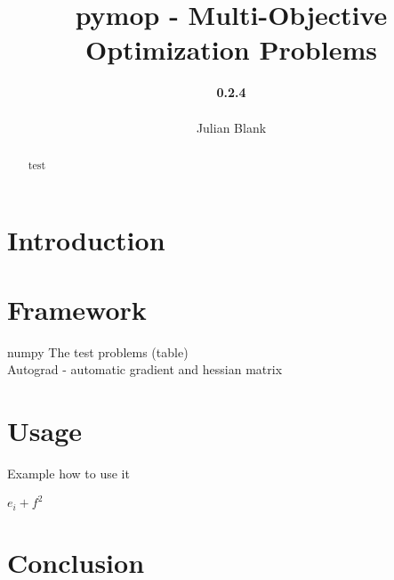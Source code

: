 \documentclass{article}
\begin{document}
	
	\title{pymop - Multi-Objective Optimization Problems}
	\author{\textbf{0.2.4} \\ \\Julian Blank}
	\date{}
	
	\maketitle
	
	\begin{abstract}
	test
	\end{abstract}
	
	\section{Introduction}

	\section{Framework}
	numpy
	The test problems (table) \\
	Autograd - automatic gradient and hessian matrix
	
	
	\section{Usage}
	Example how to use it
	
	$e_{i} + f^{2}$
	
	
	
	
	\section{Conclusion}
	

	
\end{document}
